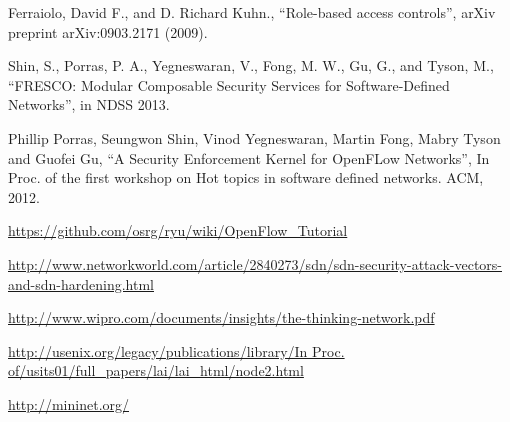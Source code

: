 \begin{thebibliography}{1}
Ferraiolo, David F., and D. Richard Kuhn., 
``Role-based access controls'', arXiv preprint arXiv:0903.2171 (2009).

Shin, S., Porras, P. A., Yegneswaran, V., Fong, M. W., Gu, G., and Tyson, M.,
``FRESCO: Modular Composable Security Services for Software-Defined Networks'', in NDSS 2013.

Phillip Porras, Seungwon Shin, Vinod Yegneswaran, Martin Fong, Mabry Tyson and Guofei Gu,
``A Security Enforcement Kernel for OpenFLow Networks'', In Proc. of the first workshop on Hot topics in software defined networks. ACM, 2012.


\url{https://github.com/osrg/ryu/wiki/OpenFlow_Tutorial}

\url{http://www.networkworld.com/article/2840273/sdn/sdn-security-attack-vectors-and-sdn-hardening.html}

\url{http://www.wipro.com/documents/insights/the-thinking-network.pdf}

\url{http://usenix.org/legacy/publications/library/In Proc. of/usits01/full_papers/lai/lai_html/node2.html}

\url{http://mininet.org/}

\end{thebibliography}